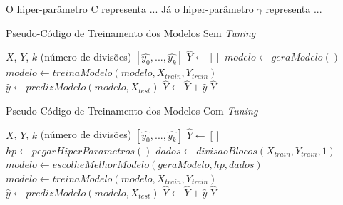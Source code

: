 O hiper-parâmetro C representa ... Já o hiper-parâmetro \(\gamma\) representa ...

\begin{algorithm}
\label{algo:training}
\caption{Pseudo-Código de Treinamento dos Modelos Sem \textit{Tuning}}
\begin{algorithmic}
\REQUIRE $X$, $Y$, $k$ (número de divisões)
\ENSURE $[\hat{y_0}, ..., \hat{y_k}]$
\STATE $\hat{Y} \leftarrow [] $
\newline
{} 
    \STATE $modelo \leftarrow geraModelo()$
    \STATE $modelo \leftarrow treinaModelo(modelo, X_{train}, Y_{train})$ 
    \newline
    \STATE $\hat{y} \leftarrow predizModelo(modelo, X_{test}) $
    \STATE $\hat{Y} \leftarrow \hat{Y} + \hat{y}$
\ENDFOR
\newline
\RETURN $\hat{Y}$
\end{algorithmic}
\end{algorithm}

\begin{algorithm}
\label{algo:tuned_training}
\caption{Pseudo-Código de Treinamento dos Modelos Com \textit{Tuning}}
\begin{algorithmic}
\REQUIRE $X$, $Y$, $k$ (número de divisões)
\ENSURE $[\hat{y_0}, ..., \hat{y_k}]$
\STATE $\hat{Y} \leftarrow [] $ 
\newline
{} 
    \STATE $hp \leftarrow pegarHiperParametros()$
    \STATE $dados \leftarrow divisaoBlocos(X_{train}, Y_{train}, 1)$
    \STATE $modelo \leftarrow escolheMelhorModelo(geraModelo, hp, dados)$
    \newline
    \STATE $modelo \leftarrow treinaModelo(modelo, X_{train}, Y_{train})$ 
    \newline
    \STATE $\hat{y} \leftarrow predizModelo(modelo, X_{test}) $
    \STATE $\hat{Y} \leftarrow \hat{Y} + \hat{y}$
    \newline
\ENDFOR
\newline
\RETURN $\hat{Y}$
\end{algorithmic}
\end{algorithm}